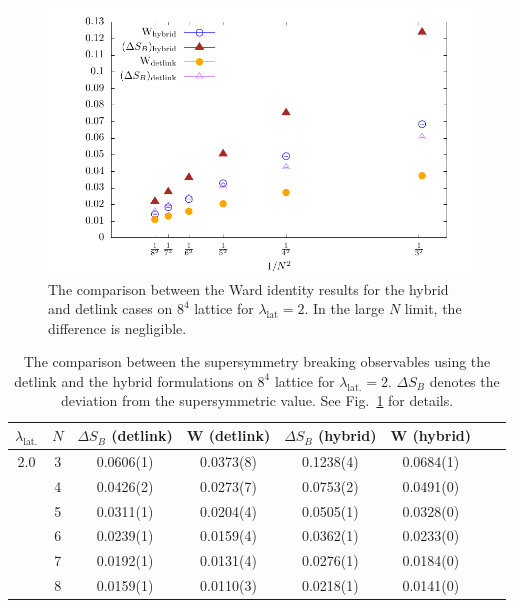 \begin{figure}
\begin{center}
\includegraphics[width=5in]{./Figures/ward_hybrid.pdf}
\caption{\label{ward_hybrid}The comparison between the Ward identity results for the hybrid and detlink cases on $8^4$ lattice for $\lambda_{\text{lat}}=2$. 
In the large $N$ limit, the difference is negligible.}
\end{center}
\end{figure}


\begin{table}
\begin{center}  
\begin{tabular}{cccccccl} 
\hline\hline
$\lambda_{\text{lat.}}$ & $N$ & $\Delta S_{B}$ (detlink) & W (detlink) & $\Delta S_{B}$ (hybrid) & W (hybrid) \\
 \hline 
2.0 & 3 & 0.0606(1)  & 0.0373(8) & 0.1238(4)   & 0.0684(1) \\
& 4 & 0.0426(2)  & 0.0273(7) & 0.0753(2) &  0.0491(0)  \\
& 5 &  0.0311(1) & 0.0204(4)  & 0.0505(1)   & 0.0328(0)  \\
& 6 & 0.0239(1)  & 0.0159(4) &  0.0362(1)  & 0.0233(0)  \\
& 7 & 0.0192(1)  & 0.0131(4) &  0.0276(1)  & 0.0184(0)   \\
& 8 &  0.0159(1) & 0.0110(3) & 0.0218(1)  & 0.0141(0)  \\
\hline  \hline
\end{tabular}
\end{center}
\caption{
\label{tab:ward-hybrid} 
The comparison between the supersymmetry breaking observables using the detlink and the hybrid formulations
on $8^4$ lattice for $\lambda_{\text{lat.}}=2$. $\Delta S_{B}$ denotes the deviation from the supersymmetric value. See Fig.~\ref{ward_hybrid} for details.} 
\end{table}


